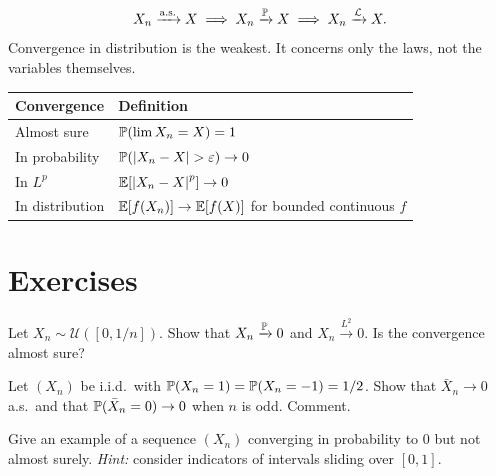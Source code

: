 \begin{theorem}
\[
    X_n \xrightarrow{\text{a.s.}} X \implies X_n \xrightarrow{\mathbb{P}} X
    \implies X_n \xrightarrow{\mathcal{L}} X.
\]
Convergence in distribution is the weakest. It concerns only the laws, not the
variables themselves.
\end{theorem}

\begin{keyformulas}[title=\textbf{Summary of convergences}]
\begin{center}
\begin{tabular}{ll}
    \toprule
    \textbf{Convergence} & \textbf{Definition} \\
    \midrule
    Almost sure & $\mathbb{P}(\lim X_n = X) = 1$ \\
    In probability & $\mathbb{P}(\left| X_n - X \right| > \varepsilon) \to 0$ \\
    In $L^p$ & $\mathbb{E}[\left| X_n - X \right|^p] \to 0$ \\
    In distribution & $\mathbb{E}[f(X_n)] \to \mathbb{E}[f(X)]$ for bounded continuous $f$ \\
    \bottomrule
\end{tabular}
\end{center}
\end{keyformulas}

\section{Exercises}

\begin{exercise}
Let $X_n \sim \mathcal{U}([0, 1/n])$. Show that $X_n \xrightarrow{\mathbb{P}} 0$
and $X_n \xrightarrow{L^2} 0$. Is the convergence almost sure?
\end{exercise}

\begin{exercise}
Let $(X_n)$ be i.i.d.\ with $\mathbb{P}(X_n = 1) = \mathbb{P}(X_n = -1) = 1/2$.
Show that $\bar{X}_n \to 0$ a.s.\ and that $\mathbb{P}(\bar{X}_n = 0) \to 0$ when $n$
is odd. Comment.
\end{exercise}

\begin{exercise}
Give an example of a sequence $(X_n)$ converging in probability to $0$ but not
almost surely.
\textit{Hint:} consider indicators of intervals sliding over $[0,1]$.
\end{exercise}

